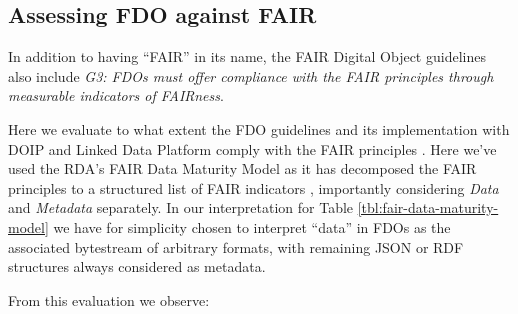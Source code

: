 \documentclass[fleqn,10pt,lineno]{wlpeerjlua}
\begin{document}



\subsection*{Assessing FDO against FAIR}\label{sec:fair-compare}

In addition to having ``FAIR'' in its name, the FAIR Digital Object guidelines \autocite{fdo-RequirementSpec} also include \emph{G3: FDOs must offer compliance with the FAIR principles through measurable indicators of FAIRness}.

Here we evaluate to what extent the FDO guidelines and its implementation with DOIP and Linked Data Platform \autocite{FDOFramework} comply with the FAIR principles \autocite{wilkinsonFAIRGuidingPrinciples2016e}. Here we've used the RDA's FAIR Data Maturity Model \autocite{groupFAIRDataMaturity2020} as it has decomposed the FAIR principles to a structured list of FAIR indicators \autocite{bahimFAIRDataMaturity2020a}, importantly considering \emph{Data} and \emph{Metadata} separately. In our interpretation for Table \vref{tbl:fair-data-maturity-model} we have for simplicity chosen to interpret ``data'' in FDOs as the associated bytestream of arbitrary formats, with remaining JSON or RDF structures always considered as metadata.



From this evaluation we observe:
\end{document}
